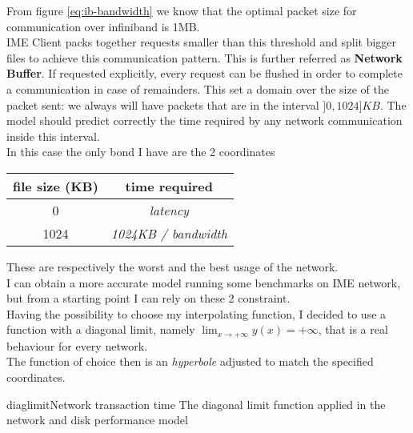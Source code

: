 From figure \ref{eq:ib-bandwidth} we know that the optimal packet size for
communication over infiniband is 1MB. \\
IME Client packs together requests smaller than this threshold and split bigger
files to achieve this communication pattern. This is further referred as
\textbf{Network Buffer}.  If requested explicitly, every request can be flushed
in order to complete a communication in case of remainders.  This set a domain
over the size of the packet sent: we always will have packets that are in the
interval $]0, 1024] KB$. The model should predict correctly the time required by
any network communication inside this interval. \\ In this case the only bond I
have are the 2 coordinates \\

\vspace{0.5cm}
\begin{tabular}{c | c}
    file size (KB) & time required \\ \hline
    0 & \textit{latency} \\ \hline
    1024 & \textit{1024KB / bandwidth}
\end{tabular}
\vspace{0.5cm}

These are respectively the worst and the best usage of the network. \\
I can obtain a more accurate model running some benchmarks on IME network, but
from a starting point I can rely on these 2 constraint. \\
Having the possibility to choose my interpolating function, I decided to use a
function with a diagonal limit, namely $\lim_{x \to +\infty} y(x) = +\infty$,
that is a real behaviour for every network. \\
The function of choice then is an \textit{hyperbole} adjusted to match the
specified coordinates. \\
\begin{myimage}{diaglimit}{Network transaction time}
    The diagonal limit function applied in the network and disk performance model
\end{myimage}


